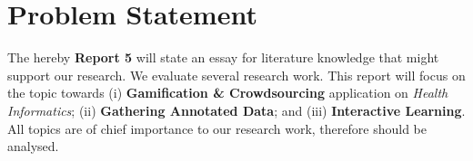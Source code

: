 \section{Problem Statement}

The hereby \textbf{Report 5} will state an essay for literature knowledge that might support our research. We evaluate several research work. This report will focus on the topic towards (i) \textbf{Gamification \& Crowdsourcing} application on \textit{Health Informatics}; (ii) \textbf{Gathering Annotated Data}; and (iii) \textbf{Interactive Learning}. All topics are of chief importance to our research work, therefore should be analysed.